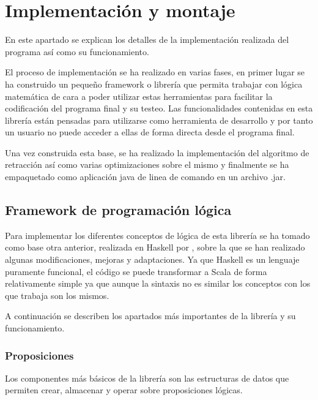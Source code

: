 \chapter*{Implementación y montaje}
	
	En este apartado se explican los detalles de la implementación realizada del programa así como su funcionamiento.
	
	El proceso de implementación se ha realizado en varias fases, en primer lugar se ha construido un pequeño framework o librería que permita trabajar con lógica matemática de cara a poder utilizar estas herramientas para facilitar la codificación del programa final y su testeo. Las funcionalidades contenidas en esta librería están pensadas para utilizarse como herramienta de desarrollo y por tanto un usuario no puede acceder a ellas de forma directa desde el programa final.
	
	Una vez construida esta base, se ha realizado la implementación del algoritmo de retracción así como varias optimizaciones sobre el mismo y finalmente se ha empaquetado como aplicación java de linea de comando en un archivo .jar.

\section*{Framework de programación lógica}

	Para implementar los diferentes conceptos de lógica de esta librería se ha tomado como base otra anterior, realizada en Haskell por , sobre la que se han realizado algunas modificaciones, mejoras y adaptaciones. Ya que Haskell es un lenguaje puramente funcional, el código se puede transformar a Scala de forma relativamente simple ya que aunque la sintaxis no es similar los conceptos con los que trabaja son los mismos.
	
	A continuación se describen los apartados más importantes de la librería y su funcionamiento.
	

\subsection*{Proposiciones}

	Los componentes más básicos de la librería son las estructuras de datos que permiten crear, almacenar y operar sobre proposiciones lógicas.
	
